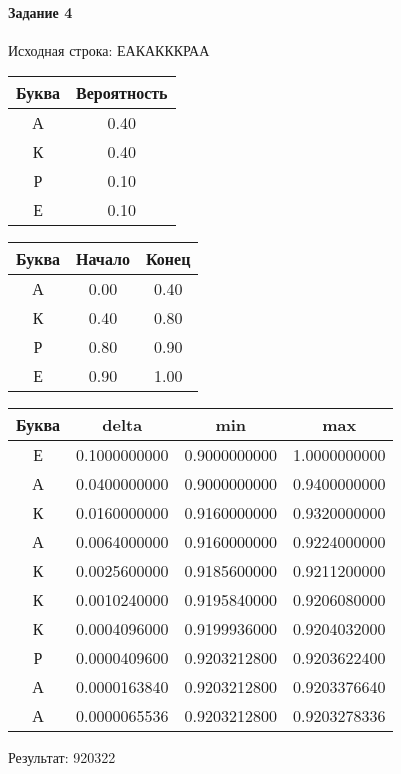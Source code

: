 \documentclass[a4paper, 12pt]{article}
\begin{document}
\paragraph{Задание 4}


Исходная строка: ЕАКАКККРАА

\begin{center}
 \begin{tabular}{ |c|c| } 
  \hline
     Буква & Вероятность \\ \hline
А & 0.40\\\hline
К & 0.40\\\hline
Р & 0.10\\\hline
Е & 0.10
\\ \hline \end{tabular}
\end{center}
\begin{center}
 \begin{tabular}{ |c|c|c| } 
  \hline
     Буква & Начало & Конец \\ \hline
А & 0.00 & 0.40\\\hline
К & 0.40 & 0.80\\\hline
Р & 0.80 & 0.90\\\hline
Е & 0.90 & 1.00
\\ \hline \end{tabular}
\end{center}
\begin{center}
 \begin{tabular}{ |c|c|c|c| } 
  \hline
     Буква & delta & min & max \\ \hline
Е & 0.1000000000 & 0.9000000000 & 1.0000000000\\\hline
А & 0.0400000000 & 0.9000000000 & 0.9400000000\\\hline
К & 0.0160000000 & 0.9160000000 & 0.9320000000\\\hline
А & 0.0064000000 & 0.9160000000 & 0.9224000000\\\hline
К & 0.0025600000 & 0.9185600000 & 0.9211200000\\\hline
К & 0.0010240000 & 0.9195840000 & 0.9206080000\\\hline
К & 0.0004096000 & 0.9199936000 & 0.9204032000\\\hline
Р & 0.0000409600 & 0.9203212800 & 0.9203622400\\\hline
А & 0.0000163840 & 0.9203212800 & 0.9203376640\\\hline
А & 0.0000065536 & 0.9203212800 & 0.9203278336
\\ \hline \end{tabular}
\end{center}
Результат: 920322
\pagebreak
\end{document}
